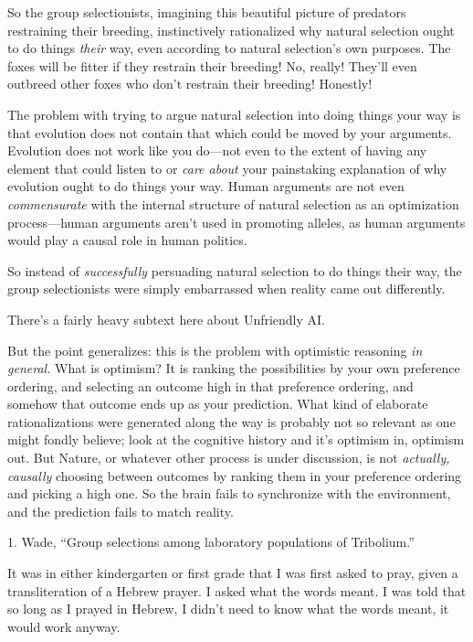 {
 So the group selectionists, imagining this beautiful picture of
predators restraining their breeding, instinctively rationalized why
natural selection ought to do things \textit{their} way, even according
to natural selection's own purposes. The foxes will be
fitter if they restrain their breeding! No, really!
They'll even outbreed other foxes who
don't restrain their breeding! Honestly!}

{
 The problem with trying to argue natural selection into doing
things your way is that evolution does not contain that which could be
moved by your arguments. Evolution does not work like you do---not even
to the extent of having any element that could listen to or
\textit{care about} your painstaking explanation of why evolution ought
to do things your way. Human arguments are not even
\textit{commensurate} with the internal structure of natural selection
as an optimization process---human arguments aren't
used in promoting alleles, as human arguments would play a causal role
in human politics.}

{
 So instead of \textit{successfully} persuading natural selection
to do things their way, the group selectionists were simply embarrassed
when reality came out differently.}

{
 There's a fairly heavy subtext here about
Unfriendly AI.}

{
 But the point generalizes: this is the problem with optimistic
reasoning \textit{in general.} What is optimism? It is ranking the
possibilities by your own preference ordering, and selecting an outcome
high in that preference ordering, and somehow that outcome ends up as
your prediction. What kind of elaborate rationalizations were generated
along the way is probably not so relevant as one might fondly believe;
look at the cognitive history and it's optimism in,
optimism out. But Nature, or whatever other process is under
discussion, is not \textit{actually, causally} choosing between
outcomes by ranking them in your preference ordering and picking a high
one. So the brain fails to synchronize with the environment, and the
prediction fails to match reality.}

\myendsectiontext


\bigskip

{
 1. Wade, ``Group selections among laboratory
populations of Tribolium.''}


{
 It was in either kindergarten or first grade that I was first
asked to pray, given a transliteration of a Hebrew prayer. I asked what
the words meant. I was told that so long as I prayed in Hebrew, I
didn't need to know what the words meant, it would work
anyway. }

